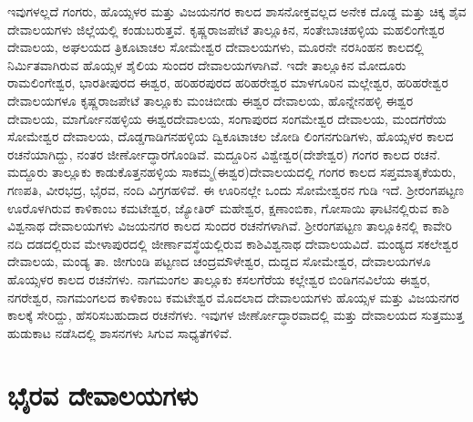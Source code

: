 ಇವುಗಳಲ್ಲದೆ ಗಂಗರು, ಹೊಯ್ಸಳರ ಮತ್ತು ವಿಜಯನಗರ ಕಾಲದ ಶಾಸನೋಕ್ತವಲ್ಲದ ಅನೇಕ ದೊಡ್ಡ ಮತ್ತು ಚಿಕ್ಕ ಶೈವ ದೇವಾಲಯಗಳು ಜಿಲ್ಲೆಯಲ್ಲಿ ಕಂಡುಬರುತ್ತವೆ. ಕೃಷ್ಣರಾಜಪೇಟೆ ತಾಲ್ಲೂಕಿನ, ಸಂತೇಬಾಚಹಳ್ಳಿಯ ಮಹಲಿಂಗೇಶ್ವರ ದೇವಾಲಯ, ಅಘಲಯದ ತ್ರಿಕೂಟಾಚಲ ಸೋಮೇಶ್ವರ ದೇವಾಲಯಗಳು, ಮೂರನೇ ನರಸಿಂಹನ ಕಾಲದಲ್ಲಿ ನಿರ್ಮಿತ\-ವಾಗಿರುವ ಹೊಯ್ಸಳ ಶೈಲಿಯ ಸುಂದರ ದೇವಾಲಯಗಳಾಗಿವೆ. ಇದೇ ತಾಲ್ಲೂಕಿನ ಮೋದೂರು ರಾಮಲಿಂಗೇಶ್ವರ, ಭಾರತೀಪುರದ ಈಶ್ವರ, ಹರಿಹರಪುರದ ಹರಿಹರೇಶ್ವರ ಮಾಳಗೂರಿನ ಮಲ್ಲೇಶ್ವರ, ಹರಿಹರೇಶ್ವರ ದೇವಾಲಯಗಳೂ ಕೃಷ್ಣರಾಜ\-ಪೇಟೆ ತಾಲ್ಲೂಕು ಮಂಚಿಬೀಡು ಈಶ್ವರ ದೇವಾಲಯ, ಹೊನ್ನೇನಹಳ್ಳಿ ಈಶ್ವರ ದೇವಾಲಯ, ಮಾರ್ಗೋನಹಳ್ಳಿಯ ಈಶ್ವರ\-ದೇವಾಲಯ, ಸಂಗಾಪುರದ ಸಂಗಮೇಶ್ವರ ದೇವಾಲಯ, ಮಂದಗೆರೆಯ ಸೋಮೇಶ್ವರ ದೇವಾಲಯ, ದೊಡ್ಡಗಾಡಿಗನಹಳ್ಳಿಯ ದ್ವಿಕೂಟಾಚಲ ಜೋಡಿ ಲಿಂಗನಗುಡಿಗಳು, ಹೊಯ್ಸಳರ ಕಾಲದ ರಚನೆಯಾಗಿದ್ದು, ನಂತರ ಜೀರ್ಣೋದ್ಧಾರಗೊಂಡಿವೆ. ಮದ್ದೂರಿನ ವಿಶ್ವೇಶ್ವರ(ದೇಶೇಶ್ವರ) ಗಂಗರ ಕಾಲದ ರಚನೆ. ಮದ್ದೂರು ತಾಲ್ಲೂಕು ಕಾಡುಕೊತ್ತನಹಳ್ಳಿಯ ಸಾಕಮ್ಮ(ಈಶ್ವರ)\-ದೇವಾಲಯದಲ್ಲಿ ಗಂಗರ ಕಾಲದ ಸಪ್ತಮಾತೃಕೆಯರು, ಗಣಪತಿ, ವೀರಭದ್ರ, ಭೈರವ, ನಂದಿ ವಿಗ್ರಗಹಳಿವೆ. ಈ ಊರಿನಲ್ಲೇ ಒಂದು ಸೋಮೇಶ್ವರನ ಗುಡಿ ಇದೆ. ಶ‍್ರೀರಂಗಪಟ್ಟಣ ಊರೊಳಗಿರುವ ಕಾಳಿಕಾಂಬ ಕಮಟೇಶ್ವರ, ಜ್ಯೋತಿರ್ \hbox{ಮಹೇಶ್ವರ}, ಕ್ಷಣಾಂಬಿಕಾ, ಗೋಸಾಯಿ ಘಾಟಿನಲ್ಲಿರುವ ಕಾಶಿ ವಿಶ್ವನಾಥ ದೇವಾಲಯಗಳು ವಿಜಯನಗರ ಕಾಲದ ಸುಂದರ ರಚನೆಗಳಾಗಿವೆ. ಶ‍್ರೀರಂಗಪಟ್ಟಣ ತಾಲ್ಲೂಕಿನಲ್ಲಿ ಕಾವೇರಿ ನದಿ ದಡದಲ್ಲಿರುವ ಮೇಳಾಪುರದಲ್ಲಿ ಜೀರ್ಣಾವಸ್ಥೆಯಲ್ಲಿರುವ ಕಾಶಿವಿಶ್ವನಾಥ ದೇವಾಲಯವಿದೆ. ಮಂಡ್ಯದ ಸಕಲೇಶ್ವರ ದೇವಾಲಯ, ಮಂಡ್ಯ ತಾ. ಜೀಗುಂಡಿ ಪಟ್ಟಣದ ಚಂದ್ರಮೌಳೇಶ್ವರ, ದುದ್ದದ ಸೋಮೇಶ್ವರ, ದೇವಾಲಯಗಳೂ ಹೊಯ್ಸಳರ ಕಾಲದ ರಚನೆಗಳು. ನಾಗಮಂಗಲ ತಾಲ್ಲೂಕು ಕಸಲಗೆರೆಯ ಕಲ್ಲೇಶ್ವರ ಬಿಂಡಿಗನವಿಲೆಯ ಈಶ್ವರ, ನಗರೇಶ್ವರ, ನಾಗಮಂಗಲದ ಕಾಳಿಕಾಂಬ ಕಮಟೇಶ್ವರ ಮೊದಲಾದ ದೇವಾಲಯಗಳು ಹೊಯ್ಸಳ ಮತ್ತು ವಿಜಯನಗರ ಕಾಲಕ್ಕೆ ಸೇರಿದ್ದು, ಹೆಸರಿಸಬಹುದಾದ ರಚನೆಗಳು. ಇವುಗಳ ಜೀರ್ಣೋದ್ಧಾರವಾದಲ್ಲಿ ಮತ್ತು ದೇವಾಲಯದ ಸುತ್ತಮುತ್ತ ಹುಡುಕಾಟ ನಡೆಸಿದಲ್ಲಿ ಶಾಸನಗಳು ಸಿಗುವ ಸಾಧ್ಯತೆಗಳಿವೆ.


\section*{ಭೈರವ ದೇವಾಲಯಗಳು}

